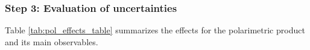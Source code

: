 



\subsubsection{Step 3: Evaluation of uncertainties}
Table \ref{tab:pol_effects_table} summarizes the effects for the polarimetric product and its main observables.

